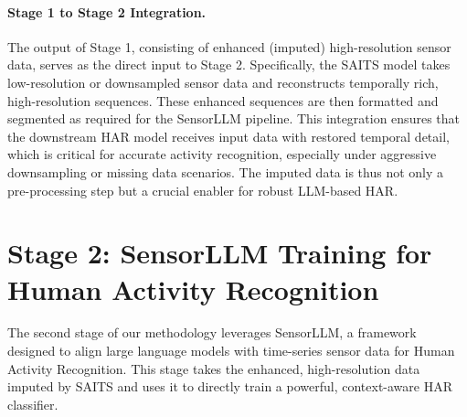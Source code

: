 \paragraph{Stage 1 to Stage 2 Integration.}
\hspace{2em}The output of Stage 1, consisting of enhanced (imputed) high-resolution sensor data, serves as the direct input to Stage 2. Specifically, the SAITS model takes low-resolution or downsampled sensor data and reconstructs temporally rich, high-resolution sequences. These enhanced sequences are then formatted and segmented as required for the SensorLLM pipeline. This integration ensures that the downstream HAR model receives input data with restored temporal detail, which is critical for accurate activity recognition, especially under aggressive downsampling or missing data scenarios. The imputed data is thus not only a pre-processing step but a crucial enabler for robust LLM-based HAR.

\section{Stage 2: SensorLLM Training for Human Activity Recognition}

\hspace{2em}The second stage of our methodology leverages SensorLLM, a framework designed to align large language models with time-series sensor data for Human Activity Recognition. This stage takes the enhanced, high-resolution data imputed by SAITS and uses it to directly train a powerful, context-aware HAR classifier.

